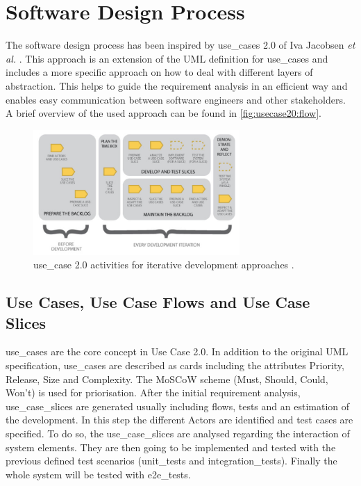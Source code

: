\section{Software Design Process}
\label{sec:design}

The software design process has been inspired by \Glspl{use_case} 2.0 of Iva Jacobsen \textit{et al.} \cite{jacobson2011usecase}. This approach is an extension of the \gls{UML} definition for \glspl{use_case} and includes a more specific approach on how to deal with different layers of abstraction. This helps to guide the requirement analysis in an efficient way and enables easy communication between software engineers and other stakeholders. A brief overview of the used approach can be found in \autoref{fig:usecase20:flow}.

\begin{figure}[!ht]
\centering
\includegraphics[width=0.7\textwidth]{figures/uc20_flow}
\caption{\Gls{use_case} 2.0 activities for iterative development approaches \cite{jacobson2011usecase}.}
\label{fig:usecase20:flow}
\end{figure}


\subsection{Use Cases, Use Case Flows and Use Case Slices}
\Glspl{use_case} are the core concept in Use Case 2.0. In addition to the original \gls{UML} specification, \glspl{use_case} are described as cards including the attributes Priority, Release, Size and Complexity. The MoSCoW scheme \cite{moscow} (Must, Should, Could, Won't) is used for priorisation. After the initial requirement analysis, \glspl{use_case_slice} are generated usually including flows, tests and an estimation of the development. In this step the different \glspl{Actor} are identified and test cases are specified. To do so, the \glspl{use_case_slice} are analysed regarding the interaction of system elements. They are then going to be implemented and tested with the previous defined test scenarios (\glspl{unit_test} and \glspl{integration_test}). Finally the whole system will be tested with \glspl{e2e_test}.

